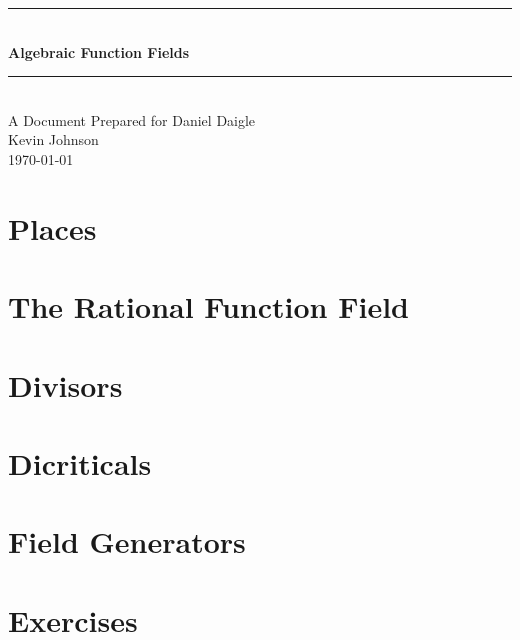 \documentclass{article}
\numberwithin{equation}{subsection}
\newcommand{\HRule}{\rule{\linewidth}{0.5mm}}
\begin{document}
	\begin{titlepage}
	\begin{center}

	\HRule \\[0.4cm] %
	{\huge \bfseries Algebraic Function Fields}\\[0.4cm] 
	\HRule \\[0.8cm] %
	{\large A Document Prepared for Daniel Daigle} \\[1.0cm]
	{\large Kevin Johnson} \\[0.5cm]
	{\large \today}\\

	\end{center}
	\end{titlepage}

	\tableofcontents
	\pagebreak


	\section{Places}
		
	\section{The Rational Function Field}
		
	\section{Divisors}
		
	\section{Dicriticals}
		
	\section{Field Generators}
		
	\section{Exercises}
		
\end{document}
